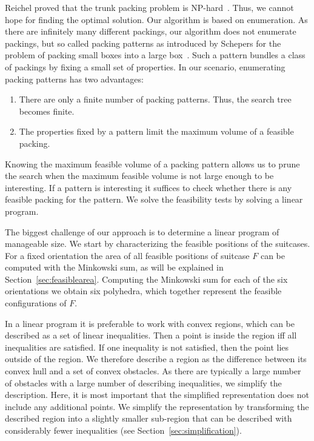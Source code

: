 \documentclass{article}
\newcounter{algo}
\begin{document}
Reichel proved that the trunk packing problem is
NP-hard~\cite{Reichel06}. Thus, we cannot hope for finding the optimal
solution. Our algorithm is based on enumeration. As there are
infinitely many different packings, our algorithm does not enumerate
packings, but so called packing patterns as introduced by Schepers for
the problem of packing small boxes into a large
box~\cite{schepers}. Such a pattern bundles a class of packings by
fixing a small set of properties. In our scenario, enumerating packing
patterns has two advantages:
\begin{enumerate}
\item There are only a finite number of packing patterns. Thus, the
search tree becomes finite.
\item The properties fixed by a pattern limit the maximum volume of a feasible packing.
\end{enumerate}
\noindent Knowing the maximum feasible volume of a packing pattern
allows us to prune the search when the maximum feasible volume is not
large enough to be interesting. If a pattern is interesting it
suffices to check whether there is any feasible packing for the
pattern. We solve the feasibility tests by solving a linear program.

The biggest challenge of our approach is to determine a linear program
of manageable size. We start by characterizing the feasible positions
of the suitcases. For a fixed orientation the area of all feasible
positions of suitcase $F$ can be computed with the Minkowski sum, as
will be explained in Section~\ref{sec:feasiblearea}. Computing the
Minkowski sum for each of the six orientations we obtain six
polyhedra, which together represent the feasible configurations of
$F$.

In a linear program it is preferable to work with convex regions,
which can be described as a set of linear inequalities. Then a point
is inside the region iff all inequalities are satisfied. If one
inequality is not satisfied, then the point lies outside of the
region. We therefore describe a region as the difference between its
convex hull and a set of convex obstacles. As there are typically a
large number of obstacles with a large number of describing
inequalities, we simplify the description.  Here, it is most important
that the simplified representation does not include any additional
points. We simplify the representation by transforming the described
region into a slightly smaller sub-region that can be described with
considerably fewer inequalities (see
Section~\ref{sec:simplification}).
\end{document}
